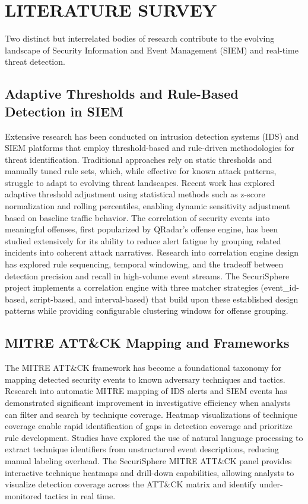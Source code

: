 \chapter{LITERATURE SURVEY}
\label{ch:literature_survey}

Two distinct but interrelated bodies of research contribute to the evolving landscape 
of Security Information and Event Management (SIEM) and real-time threat detection.

\section{Adaptive Thresholds and Rule-Based Detection in SIEM}
Extensive research has been conducted on intrusion detection systems (IDS) and SIEM platforms 
that employ threshold-based and rule-driven methodologies for threat identification. 
Traditional approaches rely on static thresholds and manually tuned rule sets, which, 
while effective for known attack patterns, struggle to adapt to evolving threat landscapes. 
Recent work has explored adaptive threshold adjustment using statistical methods such as 
z-score normalization and rolling percentiles, enabling dynamic sensitivity adjustment based 
on baseline traffic behavior. The correlation of security events into meaningful offenses, 
first popularized by QRadar's offense engine, has been studied extensively for its ability 
to reduce alert fatigue by grouping related incidents into coherent attack narratives. 
Research into correlation engine design has explored rule sequencing, temporal windowing, 
and the tradeoff between detection precision and recall in high-volume event streams. 
The SecuriSphere project implements a correlation engine with three matcher strategies 
(event_id-based, script-based, and interval-based) that build upon these established 
design patterns while providing configurable clustering windows for offense grouping.

\section{MITRE ATT\&CK Mapping and Frameworks}
The MITRE ATT\&CK framework has become a foundational taxonomy for mapping detected 
security events to known adversary techniques and tactics. Research into automatic MITRE 
mapping of IDS alerts and SIEM events has demonstrated significant improvement in 
investigative efficiency when analysts can filter and search by technique coverage. 
Heatmap visualizations of technique coverage enable rapid identification of gaps in 
detection coverage and prioritize rule development. Studies have explored the use of 
natural language processing to extract technique identifiers from unstructured event 
descriptions, reducing manual labeling overhead. The SecuriSphere MITRE ATT\&CK panel 
provides interactive technique heatmaps and drill-down capabilities, allowing analysts 
to visualize detection coverage across the ATT\&CK matrix and identify under-monitored 
tactics in real time.

